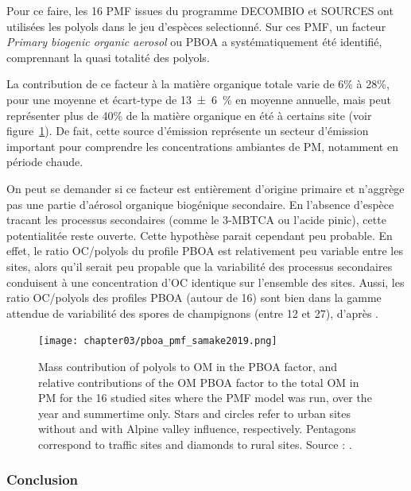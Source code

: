 Pour ce faire, les 16 PMF issues du programme DECOMBIO et SOURCES ont utilisées les polyols
dans le jeu d'espèces selectionné. Sur ces PMF, un facteur \textit{Primary biogenic
organic aerosol} ou PBOA a systématiquement été identifié, comprennant la quasi totalité
des polyols.

La contribution de ce facteur à la matière organique totale varie de 6\% à 28\%, pour une
moyenne et écart-type de \SI{13\pm6}{\percent} en moyenne annuelle, mais peut représenter
plus de 40\% de la matière organique en été à certains site (voir
figure~\ref{fig:chapter03/pboa_pmf_samake2019}).
De fait, cette source d'émission représente un secteur d'émission important pour comprendre
les concentrations ambiantes de PM, notamment en période chaude.

On peut se demander si ce facteur est entièrement d'origine primaire et
n'aggrège pas une partie d'aérosol organique biogénique secondaire. En l'absence d'espèce
tracant les processus secondaires (comme le 3-MBTCA ou l'acide pinic), cette potentialitée
reste ouverte.
Cette hypothèse parait cependant peu probable. En effet, le ratio OC/polyols du profile
PBOA est relativement peu variable entre les sites, alors qu'il serait peu propable que la
variabilité des processus secondaires conduisent à une concentration d'OC identique sur
l'ensemble des sites.
Aussi, les ratio OC/polyols des profiles PBOA (autour de 16) sont bien dans la gamme attendue de
variabilité des spores de champignons (entre 12 et 27), d'après \cite{bauerSignificant2008,yttriSource2011}.



\begin{figure}[ht]
    \centering
    \texttt{[image: chapter03/pboa\_pmf\_samake2019.png]}
    \caption{
        Mass contribution of polyols to OM in the PBOA factor, and relative contributions
        of the OM PBOA factor to the total OM in PM for the 16 studied sites where the PMF
        model was run, over the year and summertime only. Stars and circles refer to urban
        sites without and with Alpine valley influence, respectively. Pentagons correspond
        to traffic sites and diamonds to rural sites.
        Source : \cite[figure 9]{samakePolyols2019}.
    }%
    \label{fig:chapter03/pboa_pmf_samake2019}
\end{figure}

\subsubsection{Conclusion}%
\label{ssub:conclusion}

